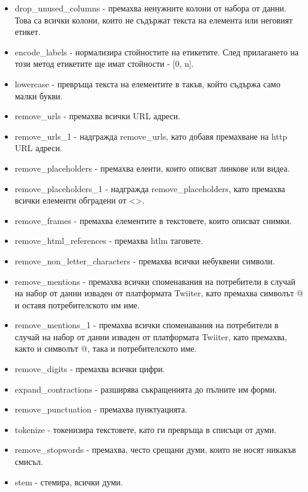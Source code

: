 \documentclass{article}
\begin{document}
    \begin{itemize}

        \item drop\_unused\_columns - премахва ненужните колони от набора от данни. Това са всички колони, които не съдържат
        текста на елемента или неговият етикет.
        \item encode\_labels - нормализира стойностите на етикетите. След прилагането на този метод етикетите ще имат
        стойности - [0, n].
        \item lowercase - превръща текста на елементите в такъв, който съдържа само малки букви.
        \item remove\_urls - премахва всички URL адреси.
        \item remove\_urls\_1 - надгражда remove\_urls, като добавя премахване на http URL адреси.
        \item remove\_placeholders - премахва еленти, които описват линкове или видеа.
        \item remove\_placeholders\_1 - надгражда remove\_placeholders, като премахва всички елементи обградени от <>.
        \item remove\_frames - премахва елементите в текстовете, които описват снимки.
        \item remove\_html\_references - премахва htlm таговете.
        \item remove\_non\_letter\_characters - премахва всички небуквени символи.
        \item remove\_mentions - премахва всички споменавания на потребители в случай на набор от данни изваден от
        платформата Twiiter, като премахва символът @ и оставя потребителското им име.
        \item remove\_mentions\_1 - премахва всички споменавания на потребители в случай на набор от данни изваден от
        платформата Twiiter, като премахва, както и символът @, така и потребителското име.
        \item remove\_digits - премахва всички цифри.
        \item expand\_contractions - разширява съкращенията до пълните им форми.
        \item remove\_punctuation - премахва пунктуацията.
        \item tokenize - токенизира текстовете, като ги превръща в списъци от думи.
        \item remove\_stopwords - премахва, често срещани думи, които не носят никакъв смисъл.
        \item stem - стемира, всички думи.

\end{itemize}
\end{document}
